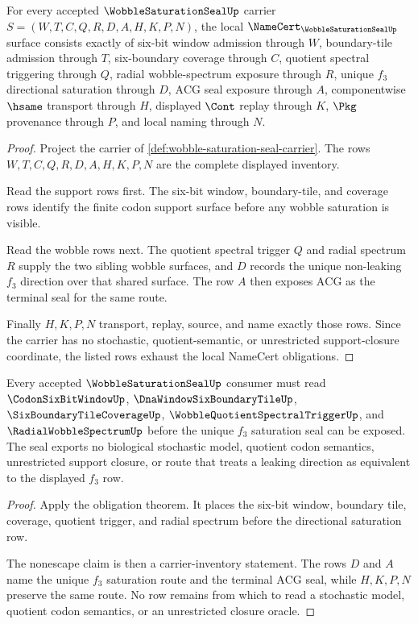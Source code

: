 \begin{theorem}
\label{thm:wobble-saturation-seal-namecert-obligations}
For every accepted $\WobbleSaturationSealUp$ carrier $S=(W,T,C,Q,R,D,A,H,K,P,N)$, the local $\NameCert_{\WobbleSaturationSealUp}$ surface consists exactly of six-bit window admission through $W$, boundary-tile admission through $T$, six-boundary coverage through $C$, quotient spectral triggering through $Q$, radial wobble-spectrum exposure through $R$, unique $f_{3}$ directional saturation through $D$, $\mathrm{ACG}$ seal exposure through $A$, componentwise $\hsame$ transport through $H$, displayed $\Cont$ replay through $K$, $\Pkg$ provenance through $P$, and local naming through $N$.
\end{theorem}
\begin{proof}
Project the carrier of \autoref{def:wobble-saturation-seal-carrier}. The rows $W,T,C,Q,R,D,A,H,K,P,N$ are the complete displayed inventory.

Read the support rows first. The six-bit window, boundary-tile, and coverage rows identify the finite codon support surface before any wobble saturation is visible.

Read the wobble rows next. The quotient spectral trigger $Q$ and radial spectrum $R$ supply the two sibling wobble surfaces, and $D$ records the unique non-leaking $f_{3}$ direction over that shared surface. The row $A$ then exposes $\mathrm{ACG}$ as the terminal seal for the same route.

Finally $H,K,P,N$ transport, replay, source, and name exactly those rows. Since the carrier has no stochastic, quotient-semantic, or unrestricted support-closure coordinate, the listed rows exhaust the local NameCert obligations.
\end{proof}

\begin{theorem}
\label{thm:wobble-saturation-seal-nonescape}
Every accepted $\WobbleSaturationSealUp$ consumer must read $\CodonSixBitWindowUp$, $\DnaWindowSixBoundaryTileUp$, $\SixBoundaryTileCoverageUp$, $\WobbleQuotientSpectralTriggerUp$, and $\RadialWobbleSpectrumUp$ before the unique $f_{3}$ saturation seal can be exposed. The seal exports no biological stochastic model, quotient codon semantics, unrestricted support closure, or route that treats a leaking direction as equivalent to the displayed $f_{3}$ row.
\end{theorem}
\begin{proof}
Apply the obligation theorem. It places the six-bit window, boundary tile, coverage, quotient trigger, and radial spectrum before the directional saturation row.

The nonescape claim is then a carrier-inventory statement. The rows $D$ and $A$ name the unique $f_{3}$ saturation route and the terminal $\mathrm{ACG}$ seal, while $H,K,P,N$ preserve the same route. No row remains from which to read a stochastic model, quotient codon semantics, or an unrestricted closure oracle.
\end{proof}

